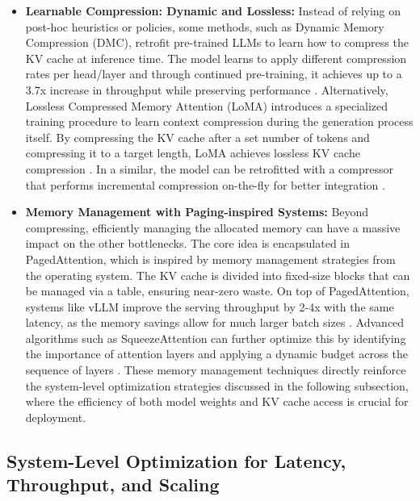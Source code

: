 \documentclass[11pt]{article}
\begin{document}
\begin{itemize}
\item
  \textbf{Learnable Compression: Dynamic and Lossless:} Instead of relying on post-hoc heuristics or policies, some methods, such as Dynamic Memory Compression (DMC), retrofit pre-trained LLMs to learn how to compress the KV cache at inference time. The model learns to apply different compression rates per head/layer and through continued pre-training, it achieves up to a 3.7x increase in throughput while preserving performance \cite{ref309}. Alternatively, Lossless Compressed Memory Attention (LoMA) introduces a specialized training procedure to learn context compression during the generation process itself. By compressing the KV cache after a set number of tokens and compressing it to a target length, LoMA achieves lossless KV cache compression \cite{ref175}. In a similar, the model can be retrofitted with a compressor that performs incremental compression on-the-fly for better integration \cite{ref310}.
\item
  \textbf{Memory Management with Paging-inspired Systems:} Beyond compressing, efficiently managing the allocated memory can have a massive impact on the other bottlenecks. The core idea is encapsulated in PagedAttention, which is inspired by memory management strategies from the operating system. The KV cache is divided into fixed-size blocks that can be managed via a table, ensuring near-zero waste. On top of PagedAttention, systems like vLLM improve the serving throughput by 2-4x with the same latency, as the memory savings allow for much larger batch sizes \cite{ref299}. Advanced algorithms such as SqueezeAttention can further optimize this by identifying the importance of attention layers and applying a dynamic budget across the sequence of layers \cite{ref174}. These memory management techniques directly reinforce the system-level optimization strategies discussed in the following subsection, where the efficiency of both model weights and KV cache access is crucial for deployment.
\end{itemize}

\subsection{System-Level Optimization for Latency, Throughput, and Scaling}
\end{document}

